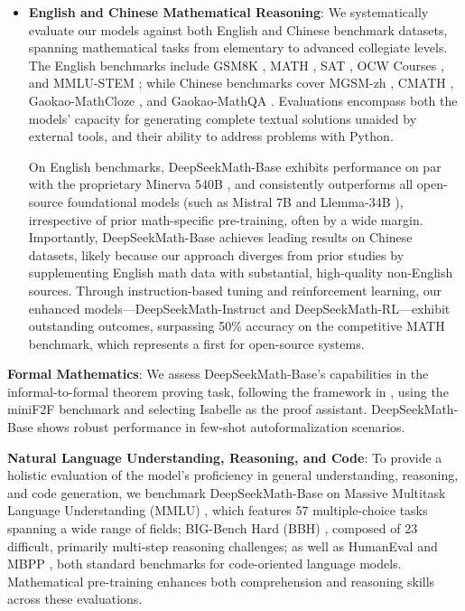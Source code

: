 \begin{itemize}[topsep=0pt]
    \item \textbf{English and Chinese Mathematical Reasoning}: We systematically evaluate our models against both English and Chinese benchmark datasets, spanning mathematical tasks from elementary to advanced collegiate levels. The English benchmarks include GSM8K \citep{gsm8k}, MATH \citep{MATH}, SAT \citep{llemma}, OCW Courses \citep{minerva}, and MMLU-STEM \citep{mmlu}; while Chinese benchmarks cover MGSM-zh \citep{mgsm}, CMATH \citep{wei2023cmath}, Gaokao-MathCloze \citep{agieval}, and Gaokao-MathQA \citep{agieval}. Evaluations encompass both the models' capacity for generating complete textual solutions unaided by external tools, and their ability to address problems with Python.

    On English benchmarks, DeepSeekMath-Base exhibits performance on par with the proprietary Minerva 540B \citep{minerva}, and consistently outperforms all open-source foundational models (such as Mistral 7B \citep{mistral} and Llemma-34B \citep{llemma}), irrespective of prior math-specific pre-training, often by a wide margin. Importantly, DeepSeekMath-Base achieves leading results on Chinese datasets, likely because our approach diverges from prior studies \citep{minerva,llemma} by supplementing English math data with substantial, high-quality non-English sources. Through instruction-based tuning and reinforcement learning, our enhanced models—DeepSeekMath-Instruct and DeepSeekMath-RL—exhibit outstanding outcomes, surpassing 50\% accuracy on the competitive MATH benchmark, which represents a first for open-source systems.
\end{itemize}

\item \textbf{Formal Mathematics}: We assess DeepSeekMath-Base’s capabilities in the informal-to-formal theorem proving task, following the framework in \citep{dsp_proof}, using the miniF2F benchmark \citep{minif2f} and selecting Isabelle \citep{isabelle} as the proof assistant. DeepSeekMath-Base shows robust performance in few-shot autoformalization scenarios.

\item \textbf{Natural Language Understanding, Reasoning, and Code}: To provide a holistic evaluation of the model’s proficiency in general understanding, reasoning, and code generation, we benchmark DeepSeekMath-Base on Massive Multitask Language Understanding (MMLU) \citep{mmlu}, which features 57 multiple-choice tasks spanning a wide range of fields; BIG-Bench Hard (BBH) \citep{bbh}, composed of 23 difficult, primarily multi-step reasoning challenges; as well as HumanEval \citep{codex} and MBPP \citep{mbpp}, both standard benchmarks for code-oriented language models. Mathematical pre-training enhances both comprehension and reasoning skills across these evaluations.

